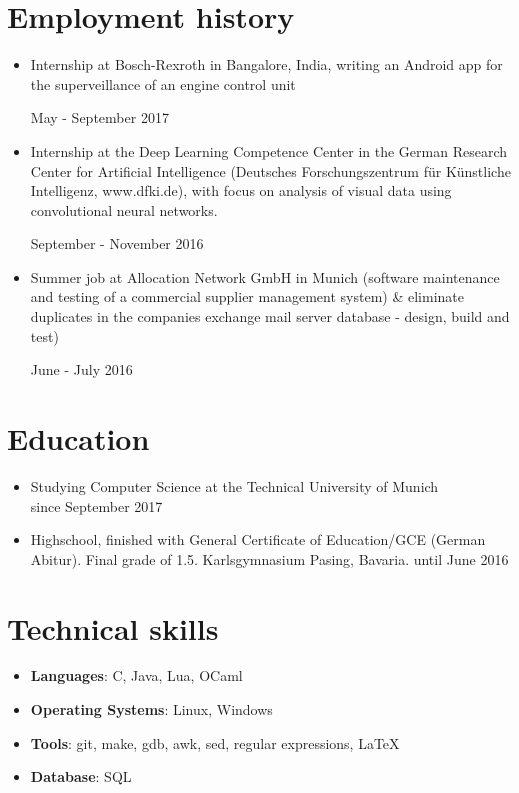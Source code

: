 \documentclass[11pt,a4paper]{article}
\begin{document}
\section*{Employment history}
\begin{itemize}
	\setlength{\itemsep}{1pt}
	\item Internship at Bosch-Rexroth in Bangalore, India, writing an Android app for the superveillance of an engine control unit \begin{flushright} May - September 2017 \end{flushright}
	\item Internship at the Deep Learning Competence Center in the German Research Center for Artificial Intelligence
	(Deutsches Forschungszentrum für Künstliche Intelligenz, www.dfki.de), with focus on analysis of
	visual data using convolutional neural networks.\\
	\begin{flushright} September - November 2016 \end{flushright}
	\item Summer job at Allocation Network GmbH in Munich (software maintenance and testing of a commercial supplier management system) \& eliminate duplicates in the companies exchange mail
	server database - design, build and test)
	\begin{flushright} June - July 2016 \end{flushright}
\end{itemize}

\section*{Education}
\begin{itemize}
	\setlength{\itemsep}{1pt}
	\item[] Studying Computer Science at the Technical University of Munich\\
	\hfill since September 2017
	\item[] Highschool, finished with General Certificate of Education/GCE (German Abitur).
	Final grade of 1.5. Karlsgymnasium Pasing, Bavaria.
	\hfill until June 2016
\end{itemize}

\section*{Technical skills}
\begin{itemize}
	\setlength{\itemsep}{1pt}
	\item[]{\bf Languages}: C, Java, Lua, OCaml
	\item[]{\bf Operating Systems}: Linux, Windows
	\item[]{\bf Tools}: git, make, gdb, awk, sed, regular expressions, LaTeX
	\item[]{\bf Database}: SQL
\end{itemize}
\end{document}
